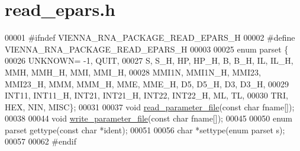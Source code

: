 \hypertarget{read__epars_8h_source}{}\section{read\+\_\+epars.\+h}
\label{read__epars_8h_source}

\begin{DoxyCode}
00001 \textcolor{preprocessor}{#ifndef VIENNA\_RNA\_PACKAGE\_READ\_EPARS\_H}
00002 \textcolor{preprocessor}{#define VIENNA\_RNA\_PACKAGE\_READ\_EPARS\_H}
00003 
00025 \textcolor{keyword}{enum} parset \{
00026   UNKNOWN= -1, QUIT,
00027   S, S\_H, HP, HP\_H, B, B\_H, IL, IL\_H, MMH, MMH\_H, MMI, MMI\_H,
00028   MMI1N, MMI1N\_H, MMI23, MMI23\_H, MMM, MMM\_H, MME, MME\_H, D5, D5\_H, D3, D3\_H,
00029   INT11, INT11\_H, INT21, INT21\_H, INT22, INT22\_H, ML, TL,
00030   TRI, HEX, NIN, MISC\};
00031 
00037 \textcolor{keywordtype}{void}  \hyperlink{group__energy__parameters__rw_ga165a142a3c68fb6655c69ef4ab7cd749}{read\_parameter\_file}(\textcolor{keyword}{const} \textcolor{keywordtype}{char} fname[]);
00038 
00044 \textcolor{keywordtype}{void}  \hyperlink{group__energy__parameters__rw_ga8a43459be386a7489feeab68dc2c6c76}{write\_parameter\_file}(\textcolor{keyword}{const} \textcolor{keywordtype}{char} fname[]);
00045 
00050 \textcolor{keyword}{enum}  parset gettype(\textcolor{keyword}{const} \textcolor{keywordtype}{char} *ident);
00051 
00056 \textcolor{keywordtype}{char}  *settype(\textcolor{keyword}{enum} parset s);
00057 
00062 \textcolor{preprocessor}{#endif}
\end{DoxyCode}
